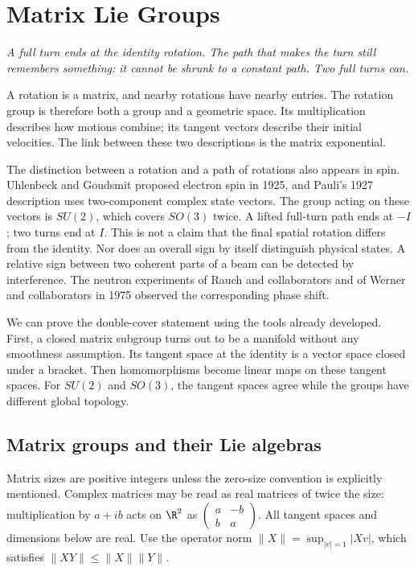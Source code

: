 \chapter{Matrix Lie Groups}

\begin{center}\itshape
A full turn ends at the identity rotation. The path that makes the turn
still remembers something: it cannot be shrunk to a constant path.
Two full turns can.
\end{center}

A rotation is a matrix, and nearby rotations have nearby entries.
The rotation group is therefore both a group and a geometric space.
Its multiplication describes how motions combine; its tangent vectors
describe their initial velocities. The link between these two descriptions
is the matrix exponential.

The distinction between a rotation and a path of rotations also appears
in spin. Uhlenbeck and Goudsmit proposed electron spin in 1925, and Pauli's
1927 description uses two-component complex state vectors.
The group acting on these vectors is $SU(2)$, which covers $SO(3)$ twice.
A lifted full-turn path ends at $-I$; two turns end at $I$.
This is not a claim that the final spatial rotation differs from the
identity. Nor does an overall sign by itself distinguish physical states.
A relative sign between two coherent parts of a beam can be detected by
interference. The neutron experiments of Rauch and collaborators and of
Werner and collaborators in 1975 observed the corresponding phase shift.

We can prove the double-cover statement using the tools already developed.
First, a closed matrix subgroup turns out to be a manifold without any
smoothness assumption. Its tangent space at the identity is a vector
space closed under a bracket. Then homomorphisms become linear maps on
these tangent spaces. For $SU(2)$ and $SO(3)$, the tangent spaces agree
while the groups have different global topology.

\section{Matrix groups and their Lie algebras}

Matrix sizes are positive integers unless the zero-size convention is
explicitly mentioned. Complex matrices may be read as real matrices of
twice the size: multiplication by $a+ib$ acts on $\R^2$ as
$\left(\begin{smallmatrix}a&-b\\b&a\end{smallmatrix}\right)$.
All tangent spaces and dimensions below are real.
Use the operator norm $\|X\|=\sup_{|v|=1}|Xv|$, which satisfies
$\|XY\|\le\|X\|\|Y\|$.

